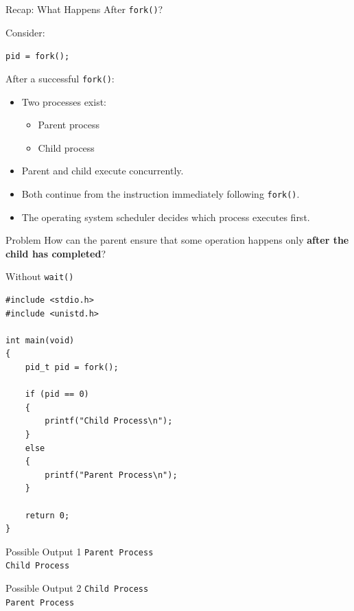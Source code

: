 \documentclass[aspectratio=169]{beamer}
\begin{document}
\begin{frame}{Recap: What Happens After \texttt{fork()}?}

Consider:

\begin{center}
\texttt{pid = fork();}
\end{center}

After a successful \texttt{fork()}:

\begin{itemize}

    \item Two processes exist:
    \begin{itemize}
        \item Parent process
        \item Child process
    \end{itemize}

    \item Parent and child execute concurrently.

    \item Both continue from the instruction immediately following
    \texttt{fork()}.

    \item The operating system scheduler decides which process executes first.

\end{itemize}

\begin{alertblock}{Problem}
How can the parent ensure that some operation happens only
\textbf{after the child has completed}?
\end{alertblock}

\end{frame}

\begin{frame}[fragile]{Without \texttt{wait()}}

\begin{lstlisting}[style=cstyle]
#include <stdio.h>
#include <unistd.h>

int main(void)
{
    pid_t pid = fork();

    if (pid == 0)
    {
        printf("Child Process\n");
    }
    else
    {
        printf("Parent Process\n");
    }

    return 0;
}
\end{lstlisting}

\begin{block}{Possible Output 1}
\texttt{Parent Process}\\
\texttt{Child Process}
\end{block}

\begin{block}{Possible Output 2}
\texttt{Child Process}\\
\texttt{Parent Process}
\end{block}

\end{frame}
\end{document}
